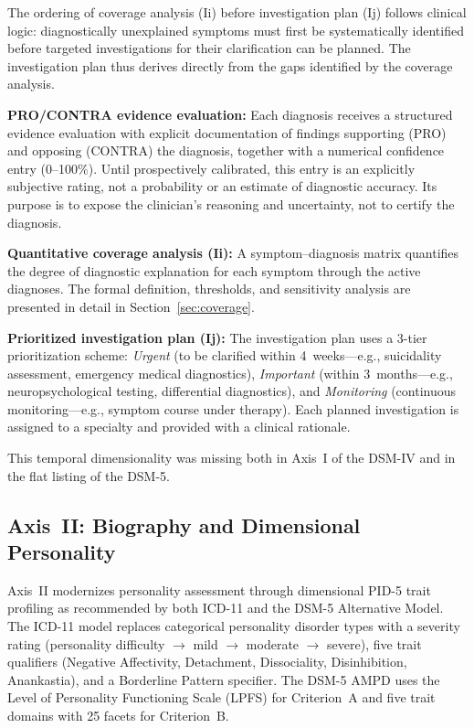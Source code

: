 \documentclass[11pt,a4paper]{article}
\begin{document}
The ordering of coverage analysis (Ii) before investigation plan (Ij) follows clinical logic: diagnostically unexplained symptoms must first be systematically identified before targeted investigations for their clarification can be planned. The investigation plan thus derives directly from the gaps identified by the coverage analysis.

\textbf{PRO/CONTRA evidence evaluation:} Each diagnosis receives a structured evidence evaluation with explicit documentation of findings supporting (PRO) and opposing (CONTRA) the diagnosis, together with a numerical confidence entry (0--100\%). Until prospectively calibrated, this entry is an explicitly subjective rating, not a probability or an estimate of diagnostic accuracy. Its purpose is to expose the clinician's reasoning and uncertainty, not to certify the diagnosis.

\textbf{Quantitative coverage analysis (Ii):} A symptom--diagnosis matrix quantifies the degree of diagnostic explanation for each symptom through the active diagnoses. The formal definition, thresholds, and sensitivity analysis are presented in detail in Section~\ref{sec:coverage}.

\textbf{Prioritized investigation plan (Ij):} The investigation plan uses a 3-tier prioritization scheme: \textit{Urgent} (to be clarified within 4~weeks---e.g., suicidality assessment, emergency medical diagnostics), \textit{Important} (within 3~months---e.g., neuropsychological testing, differential diagnostics), and \textit{Monitoring} (continuous monitoring---e.g., symptom course under therapy). Each planned investigation is assigned to a specialty and provided with a clinical rationale.

This temporal dimensionality was missing both in Axis~I of the DSM-IV and in the flat listing of the DSM-5.

\subsection{Axis~II: Biography and Dimensional Personality}

Axis~II modernizes personality assessment through dimensional PID-5 trait profiling as recommended by both ICD-11 and the DSM-5 Alternative Model. The ICD-11 model replaces categorical personality disorder types with a severity rating (personality difficulty $\to$ mild $\to$ moderate $\to$ severe), five trait qualifiers (Negative Affectivity, Detachment, Dissociality, Disinhibition, Anankastia), and a Borderline Pattern specifier. The DSM-5 AMPD uses the Level of Personality Functioning Scale (LPFS) for Criterion~A and five trait domains with 25 facets for Criterion~B.
\end{document}
